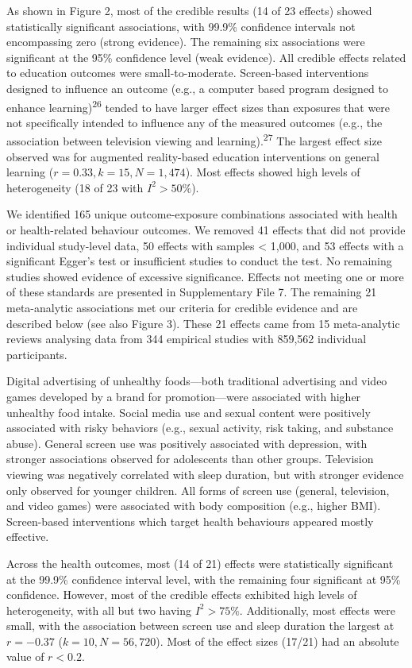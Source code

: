 \documentclass[
  english,
  man]{apa6}
\begin{document}
As shown in Figure 2, most of the credible results (14 of 23 effects) showed statistically significant associations, with 99.9\% confidence intervals not encompassing zero (strong evidence).
The remaining six associations were significant at the 95\% confidence level (weak evidence).
All credible effects related to education outcomes were small-to-moderate.
Screen-based interventions designed to influence an outcome (e.g., a computer based program designed to enhance learning)\textsuperscript{26} tended to have larger effect sizes than exposures that were not specifically intended to influence any of the measured outcomes (e.g., the association between television viewing and learning).\textsuperscript{27}
The largest effect size observed was for augmented reality-based education interventions on general learning (\(r = 0.33, k = 15, N = 1,474\)).
Most effects showed high levels of heterogeneity (18 of 23 with \(I^2 > 50\%\)).

We identified 165 unique outcome-exposure combinations associated with health or health-related behaviour outcomes.
We removed 41 effects that did not provide individual study-level data, 50 effects with samples \textless{} 1,000, and 53 effects with a significant Egger's test or insufficient studies to conduct the test.
No remaining studies showed evidence of excessive significance.
Effects not meeting one or more of these standards are presented in Supplementary File 7.
The remaining 21 meta-analytic associations met our criteria for credible evidence and are described below (see also Figure 3).
These 21 effects came from 15 meta-analytic reviews analysing data from 344 empirical studies with 859,562 individual participants.

Digital advertising of unhealthy foods---both traditional advertising and video games developed by a brand for promotion---were associated with higher unhealthy food intake.
Social media use and sexual content were positively associated with risky behaviors (e.g., sexual activity, risk taking, and substance abuse).
General screen use was positively associated with depression, with stronger associations observed for adolescents than other groups.
Television viewing was negatively correlated with sleep duration, but with stronger evidence only observed for younger children.
All forms of screen use (general, television, and video games) were associated with body composition (e.g., higher BMI).
Screen-based interventions which target health behaviours appeared mostly effective.

Across the health outcomes, most (14 of 21) effects were statistically significant at the 99.9\% confidence interval level, with the remaining four significant at 95\% confidence.
However, most of the credible effects exhibited high levels of heterogeneity, with all but two having \(I^2 > 75\%\).
Additionally, most effects were small, with the association between screen use and sleep duration the largest at \(r = -0.37\) (\(k = 10, N = 56,720\)).
Most of the effect sizes (17/21) had an absolute value of \(r < 0.2\).
\end{document}
